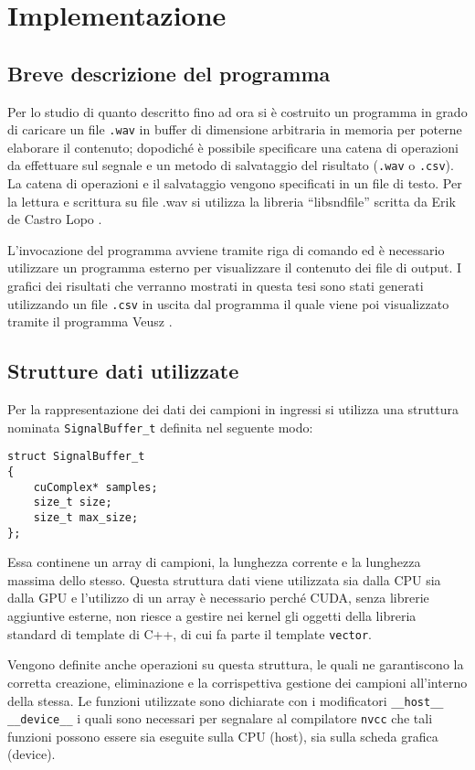 \chapter{Implementazione}

\section{Breve descrizione del programma}
Per lo studio di quanto descritto fino ad ora si è costruito un programma in grado di caricare un file \lstinline{.wav} in buffer di dimensione arbitraria in memoria per poterne elaborare il contenuto; dopodiché è possibile specificare una catena di operazioni da effettuare sul segnale e un metodo di salvataggio del risultato (\lstinline{.wav} o \lstinline{.csv}). La catena di operazioni e il salvataggio vengono specificati in un file di testo. Per la lettura e scrittura su file .wav si utilizza la libreria ``libsndfile'' scritta da Erik de Castro Lopo \cite{libsndfile}.

L'invocazione del programma avviene tramite riga di comando ed è necessario utilizzare un programma esterno per visualizzare il contenuto dei file di output. I grafici dei risultati che verranno mostrati in questa tesi sono stati generati utilizzando un file \lstinline{.csv} in uscita dal programma il quale viene poi visualizzato tramite il programma Veusz \cite{veusz}.

\section{Strutture dati utilizzate}

Per la rappresentazione dei dati dei campioni in ingressi si utilizza una struttura nominata \lstinline{SignalBuffer_t} definita nel seguente modo:

\begin{lstlisting}
struct SignalBuffer_t
{
    cuComplex* samples;
    size_t size;
    size_t max_size;
};
\end{lstlisting}

Essa continene un array di campioni, la lunghezza corrente e la lunghezza massima dello stesso. Questa struttura dati viene utilizzata sia dalla CPU sia dalla GPU e l'utilizzo di un array è necessario perché CUDA, senza librerie aggiuntive esterne, non riesce a gestire nei kernel gli oggetti della libreria standard di template di C++, di cui fa parte il template \lstinline{vector}.

Vengono definite anche operazioni su questa struttura, le quali ne garantiscono la corretta creazione, eliminazione e la corrispettiva gestione dei campioni all'interno della stessa. Le funzioni utilizzate sono dichiarate con i modificatori \lstinline{__host__ __device__} i quali sono necessari per segnalare al compilatore \lstinline{nvcc} che tali funzioni possono essere sia eseguite sulla CPU (host), sia sulla scheda grafica (device).


